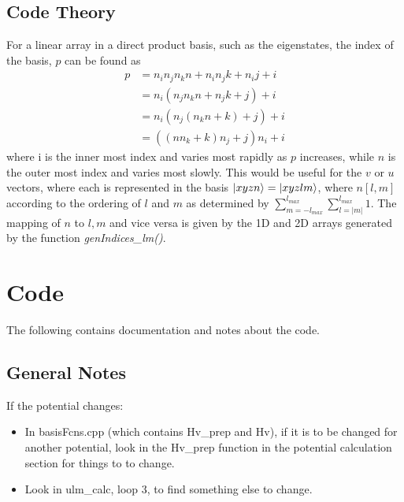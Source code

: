 \documentclass{revtex4-1}
\begin{document}


\subsection{Code Theory}\label{S:CodeTheory}
For a linear array in a direct product basis, such as the eigenstates, the index of the basis, $p$ can be found as
\begin{align}
p &= n_{i}n_{j}n_{k}n + n_{i}n_{j}k + n_{i}j + i\\
  &= n_{i}(n_{j}n_{k}n + n_{j}k + j) + i\\
  &= n_{i}(n_{j}(n_{k}n + k) + j) + i\\
  &= ((nn_{k}+k)n_{j} + j)n_{i} + i
\end{align}
where i is the inner most index and varies most rapidly as $p$ increases, while $n$ is the outer most index and varies most slowly. This would be useful for the $v$ or $u$ vectors, where each is represented in the basis $\ket{xyzn} = \ket{xyzlm}$, where $n[l,m]$ according to the ordering of $l$ and $m$ as determined by $\sum_{m=-l_{max}}^{l_{max}}\sum_{l=|m|}^{l_{max}}1$. The mapping of $n$ to $l,m$ and vice versa is given by the 1D and 2D arrays generated by the function {\em genIndices\_lm()}.
													

\section{Code}\label{S:code}
The following contains documentation and notes about the code.

\subsection{General Notes}\label{S:CodeNotes}

If the potential changes:
\begin{itemize}
\item In basisFcns.cpp (which contains Hv\_prep and Hv), if it is to be changed for another potential, look in the Hv\_prep function in the potential calculation section for things to to change. 
\item Look in ulm\_calc, loop 3, to find something else to change.
\end{itemize}
	
\end{document}
